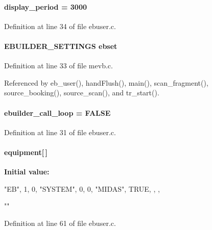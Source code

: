 \paragraph[{display\_\-period}]{ {\bf display\_\-period} = 3000}\hfill\label{ebuser_8c_ab9cdcefda91459091b0ed33011d0d18c}


Definition at line 34 of file ebuser.c.
\paragraph[{ebset}]{\setlength{\rightskip}{0pt plus 5cm}EBUILDER\_\-SETTINGS {\bf ebset}}\hfill\label{ebuser_8c_a70fcf09808475481c64facd46bd95dfc}


Definition at line 33 of file mevb.c.

Referenced by eb\_\-user(), handFlush(), main(), scan\_\-fragment(), source\_\-booking(), source\_\-scan(), and tr\_\-start().
\paragraph[{ebuilder\_\-call\_\-loop}]{ {\bf ebuilder\_\-call\_\-loop} = FALSE}\hfill\label{ebuser_8c_a6547578efd20c2b6d77e2d896d6bf620}


Definition at line 31 of file ebuser.c.
\paragraph[{equipment}]{ {\bf equipment}\mbox{[}$\,$\mbox{]}}\hfill\label{ebuser_8c_aa86ef8764826784b74603ffb23852283}
{\bfseries Initial value:}
\begin{DoxyCode}
 {
   {"EB",                
    {1, 0,                   
     "SYSTEM",               
     0,                      
     0,                      
     "MIDAS",                
     TRUE,                   
     },
    },

  {""}
}
\end{DoxyCode}


Definition at line 61 of file ebuser.c.
